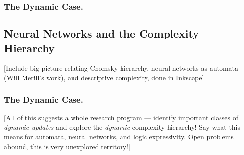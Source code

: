 \documentclass[letterpaper]{article}
\begin{document}
\subsubsection*{The Dynamic Case.}

\subsection*{Neural Networks and the Complexity Hierarchy}

[Include big picture relating Chomsky hierarchy, neural networks as automata (Will Merill's work), and descriptive complexity, done in Inkscape]

\subsubsection*{The Dynamic Case.}

[All of this suggests a whole research program --- identify important classes of \emph{dynamic updates} and explore the \emph{dynamic} complexity hierarchy! Say what this means for automata, neural networks, and logic expressivity.  Open problems abound, this is very unexplored territory!]

\printbibliography
\end{document}
